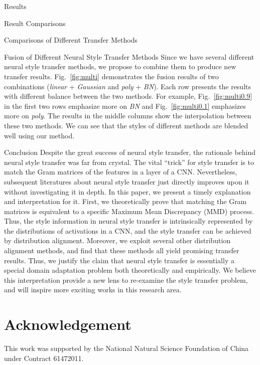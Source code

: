 \documentclass{article}
\begin{document}
\begin{section}{Results}
\begin{subsection}{Result Comparisons}
\begin{paragraph}{Comparisons of Different Transfer Methods}
\end{paragraph}

\begin{paragraph}{Fusion of Different Neural Style Transfer Methods}
Since we have several different neural style transfer methods, we propose to combine them to produce new transfer results. Fig.~\ref{fig:multi} demonstrates the fusion results of two combinations (\emph{linear} + \emph{Gaussian} and \emph{poly} + \emph{BN}). Each row presents the results with different balance between the two methods. For example, Fig.~\ref{fig:multi0.9} in the first two rows emphasize more on \emph{BN} and Fig.~\ref{fig:multi0.1} emphasizes more on \emph{poly}. The results in the middle columns show the interpolation between these two methods. We can see that the styles of different methods are blended well using our method.




\end{paragraph}








\end{subsection}







\end{section}

\begin{section}{Conclusion}
Despite the great success of neural style transfer, the rationale behind neural style transfer was far from crystal. The vital ``trick'' for style transfer is to match the Gram matrices of the features in a layer of a CNN. Nevertheless, subsequent literatures about neural style transfer just directly improves upon it without investigating it in depth. In this paper, we present a timely explanation and interpretation for it. First, we theoretically prove that matching the Gram matrices is equivalent to a specific Maximum Mean Discrepancy (MMD) process. Thus, the style information in neural style transfer is intrinsically represented by the  distributions of activations in a CNN, and the style transfer can be achieved by distribution alignment. Moreover, we exploit several other distribution alignment methods, and find that these methods all yield promising transfer results. Thus, we justify the claim that neural style transfer is essentially a special domain adaptation problem both theoretically and empirically. We believe this interpretation provide a new lens to re-examine the style transfer problem, and will inspire more exciting works in this research area.



\end{section}


\section*{Acknowledgement} This work was supported by the National Natural Science Foundation of China under Contract 61472011.



{


}
\end{document}
